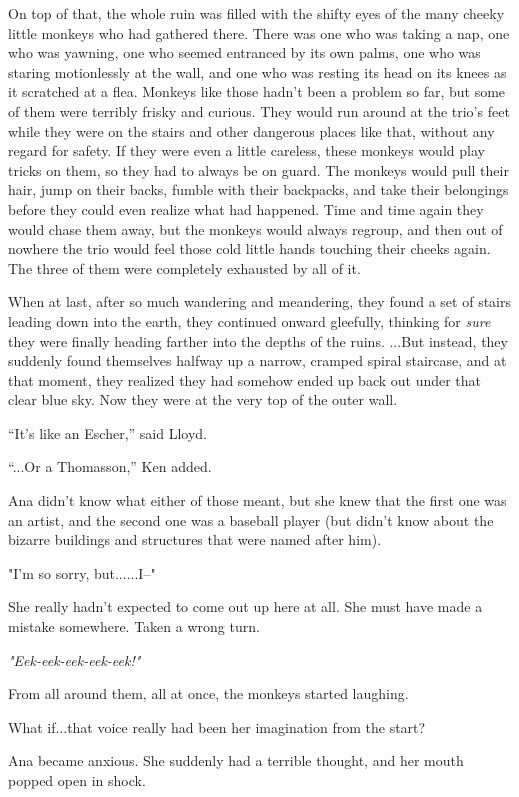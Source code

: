 \documentclass[
]{article}
\begin{document}
On top of that, the whole ruin was filled with the shifty eyes of the
many cheeky little monkeys who had gathered there. There was one who was
taking a nap, one who was yawning, one who seemed entranced by its own
palms, one who was staring motionlessly at the wall, and one who was
resting its head on its knees as it scratched at a flea. Monkeys like
those hadn't been a problem so far, but some of them were terribly
frisky and curious. They would run around at the trio's feet while they
were on the stairs and other dangerous places like that, without any
regard for safety. If they were even a little careless, these monkeys
would play tricks on them, so they had to always be on guard. The
monkeys would pull their hair, jump on their backs, fumble with their
backpacks, and take their belongings before they could even realize what
had happened. Time and time again they would chase them away, but the
monkeys would always regroup, and then out of nowhere the trio would
feel those cold little hands touching their cheeks again. The three of
them were completely exhausted by all of it.

When at last, after so much wandering and meandering, they found a set
of stairs leading down into the earth, they continued onward gleefully,
thinking for \emph{sure} they were finally heading farther into the
depths of the ruins. ...But instead, they suddenly found themselves
halfway up a narrow, cramped spiral staircase, and at that moment, they
realized they had somehow ended up back out under that clear blue sky.
Now they were at the very top of the outer wall.

``It's like an Escher,'' said Lloyd.

``...Or a Thomasson,'' Ken added.

Ana didn't know what either of those meant, but she knew that the first
one was an artist, and the second one was a baseball player (but didn't
know about the bizarre buildings and structures that were named after
him).

"I'm so sorry, but......I--"

She really hadn't expected to come out up here at all. She must have
made a mistake somewhere. Taken a wrong turn.

\emph{"Eek-eek-eek-eek-eek!"}

From all around them, all at once, the monkeys started laughing.

What if...that voice really had been her imagination from the start?

Ana became anxious. She suddenly had a terrible thought, and her mouth
popped open in shock.
\end{document}
